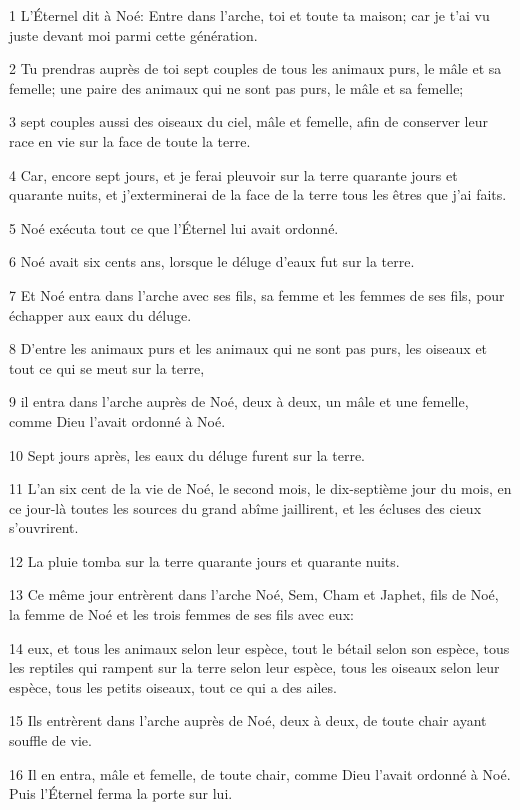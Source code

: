 \par 1 L'Éternel dit à Noé: Entre dans l'arche, toi et toute ta maison; car je t'ai vu juste devant moi parmi cette génération.
\par 2 Tu prendras auprès de toi sept couples de tous les animaux purs, le mâle et sa femelle; une paire des animaux qui ne sont pas purs, le mâle et sa femelle;
\par 3 sept couples aussi des oiseaux du ciel, mâle et femelle, afin de conserver leur race en vie sur la face de toute la terre.
\par 4 Car, encore sept jours, et je ferai pleuvoir sur la terre quarante jours et quarante nuits, et j'exterminerai de la face de la terre tous les êtres que j'ai faits.
\par 5 Noé exécuta tout ce que l'Éternel lui avait ordonné.
\par 6 Noé avait six cents ans, lorsque le déluge d'eaux fut sur la terre.
\par 7 Et Noé entra dans l'arche avec ses fils, sa femme et les femmes de ses fils, pour échapper aux eaux du déluge.
\par 8 D'entre les animaux purs et les animaux qui ne sont pas purs, les oiseaux et tout ce qui se meut sur la terre,
\par 9 il entra dans l'arche auprès de Noé, deux à deux, un mâle et une femelle, comme Dieu l'avait ordonné à Noé.
\par 10 Sept jours après, les eaux du déluge furent sur la terre.
\par 11 L'an six cent de la vie de Noé, le second mois, le dix-septième jour du mois, en ce jour-là toutes les sources du grand abîme jaillirent, et les écluses des cieux s'ouvrirent.
\par 12 La pluie tomba sur la terre quarante jours et quarante nuits.
\par 13 Ce même jour entrèrent dans l'arche Noé, Sem, Cham et Japhet, fils de Noé, la femme de Noé et les trois femmes de ses fils avec eux:
\par 14 eux, et tous les animaux selon leur espèce, tout le bétail selon son espèce, tous les reptiles qui rampent sur la terre selon leur espèce, tous les oiseaux selon leur espèce, tous les petits oiseaux, tout ce qui a des ailes.
\par 15 Ils entrèrent dans l'arche auprès de Noé, deux à deux, de toute chair ayant souffle de vie.
\par 16 Il en entra, mâle et femelle, de toute chair, comme Dieu l'avait ordonné à Noé. Puis l'Éternel ferma la porte sur lui.
